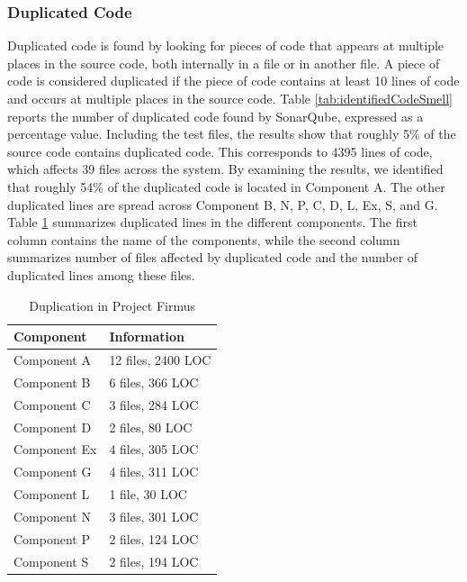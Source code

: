 \subsubsection{Duplicated Code}
Duplicated code is found by looking for pieces of code that appears at multiple places in the source code, both internally in a file or in another file. A piece of code is considered duplicated if the piece of code contains at least 10 lines of code and occurs at multiple places in the source code. Table \ref{tab:identifiedCodeSmell} reports the number of duplicated code found by SonarQube, expressed as a percentage value. Including the test files, the results show that roughly 5\% of the source code contains duplicated code. This corresponds to 4395 lines of code, which affects 39 files across the system. By examining the results, we identified that roughly 54\% of the duplicated code is located in Component A. The other duplicated lines are spread across Component B, N, P, C, D, L, Ex, S, and G. Table \ref{tab:duplicatedLines} summarizes duplicated lines in the different components. The first column contains the name of the components, while the second column summarizes number of files affected by duplicated code and the number of duplicated lines among these files.

\begin{table}[]
\centering
\caption{Duplication in Project Firmus}
\label{tab:duplicatedLines}
\begin{tabular}{|l|l|}
\hline
\textbf{Component}			& \textbf{Information} \\ \hline
Component A 				& 12 files, 2400 LOC \\ \hline
Component B 				& 6 files, 366 LOC \\ \hline
Component C 				& 3 files, 284 LOC \\ \hline
Component D 				& 2 files, 80 LOC \\ \hline
Component Ex 				& 4 files, 305 LOC \\ \hline
Component G 				& 4 files, 311 LOC \\ \hline
Component L 				& 1 file, 30 LOC \\ \hline
Component N 				& 3 files, 301 LOC \\ \hline
Component P 				& 2 files, 124 LOC \\ \hline
Component S 				& 2 files, 194 LOC \\ \hline
\end{tabular}
\end{table}


